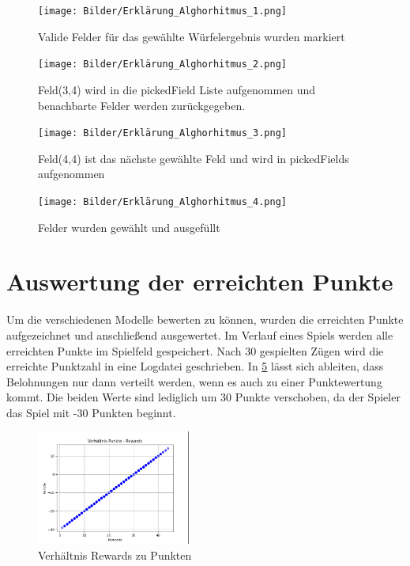 \begin{figure}[!h]
	\centering
	\texttt{[image: Bilder/Erklärung\_Alghorhitmus\_1.png]}
	\caption{Valide Felder für das gewählte Würfelergebnis wurden markiert}
    \label{fig:alg1}
\end{figure}

\begin{figure}[!h]
	\centering
	\texttt{[image: Bilder/Erklärung\_Alghorhitmus\_2.png]}
	\caption{Feld(3,4) wird in die pickedField Liste aufgenommen und benachbarte Felder werden zurückgegeben.}
    \label{fig:alg2}
\end{figure}


\begin{figure}[!h]
	\centering
	\texttt{[image: Bilder/Erklärung\_Alghorhitmus\_3.png]}
	\caption{Feld(4,4) ist das nächste gewählte Feld und wird in pickedFields aufgenommen}
    \label{fig:alg3}
\end{figure}


\begin{figure}[!h]
	\centering
	\texttt{[image: Bilder/Erklärung\_Alghorhitmus\_4.png]}
	\caption{Felder wurden gewählt und ausgefüllt}
    \label{fig:alg4}
\end{figure}
\clearpage
\section{Auswertung der erreichten Punkte}
Um die verschiedenen Modelle bewerten zu können, wurden die erreichten Punkte aufgezeichnet und anschließend ausgewertet.
Im Verlauf eines Spiels werden alle erreichten Punkte im Spielfeld gespeichert. 
Nach 30 gespielten Zügen wird die erreichte Punktzahl in eine Logdatei geschrieben.
In \ref{fig:punktWolke} lässt sich ableiten, dass Belohnungen nur dann verteilt werden, wenn es auch zu einer Punktewertung kommt. Die beiden Werte sind lediglich um 30 Punkte verschoben, da der Spieler das Spiel mit -30 Punkten beginnt.

\begin{figure}[!h]
	\centering
	\includegraphics[width=0.45\textwidth]{Bilder/punktWolke.png}
	\caption{Verhältnis Rewards zu Punkten}
    \label{fig:punktWolke}
\end{figure}


